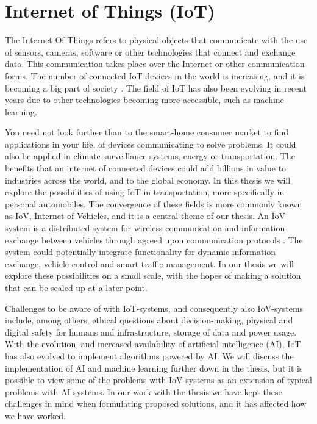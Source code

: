 \section{Internet of Things (IoT)}
The Internet Of Things refers to physical objects that communicate with the use of sensors, cameras, software or other technologies that connect and exchange data. This communication takes place over the Internet or other communication forms. The number of connected IoT-devices in the world is increasing, and it is becoming a big part of society \parencite{iot_analytics}. The field of IoT has also been evolving in recent years due to other technologies becoming more accessible, such as machine learning.

You need not look further than to the smart-home consumer market to find applications in your life, of devices communicating to solve problems. It could also be applied in climate surveillance systems, energy or transportation. The benefits that an internet of connected devices could add billions in value to industries across the world, and to the global economy. In this thesis we will explore the possibilities of using IoT in transportation, more specifically in personal automobiles. The convergence of these fields is more commonly known as IoV, Internet of Vehicles, and it is a central theme of our thesis. An IoV system is a distributed system for wireless communication and information exchange between vehicles through agreed upon communication protocols \parencite{chinese_iov}.  The system could potentially integrate functionality for dynamic information exchange, vehicle control and  smart traffic management. In our thesis we will explore these possibilities on a small scale, with the hopes of making a solution that can be scaled up at a later point. 

Challenges to be aware of with IoT-systems, and consequently also IoV-systems include, among others, ethical questions about decision-making, physical and digital safety for humans and infrastructure, storage of data and power usage. With the evolution, and increased availability of artificial intelligence (AI), IoT has also evolved to implement algorithms powered by AI. We will discuss the implementation of AI and machine learning further down in the thesis, but it is possible to view some of the problems with IoV-systems as an extension of typical problems with AI systems. In our work with the thesis we have kept these challenges in mind when formulating proposed solutions, and it has affected how we have worked.
